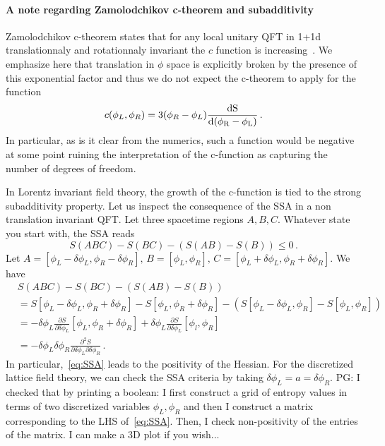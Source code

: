 \documentclass[a4paper]{article}
\newcommand{\purple}[1]{{\color{purple} #1 \color{black}}}
\newcommand{\PG}[1]{{\purple{PG: #1}}} %
\begin{document}
\paragraph{A note regarding Zamolodchikov c-theorem and subadditivity}
Zamolodchikov c-theorem states that for any local unitary QFT in 1+1d translationnaly and rotationnaly invariant the $c$ function is increasing~\cite{Zamolodchikov:1986gt}\cite{Casini_2007}. We emphasize here that translation in $\phi$ space is explicitly broken by the presence of this exponential factor and thus we do not expect the c-theorem to apply for the function
\begin{equation}
  c(\phi_L,\phi_R) = 3(\phi_R-\phi_L)\frac{\rm{d} S}{\rm{d}(\phi_R -\phi_L)}\,.
\end{equation}
In particular, as is it clear from the numerics, such a function would be negative at some point ruining the interpretation of the c-function as capturing the number of degrees of freedom.

In Lorentz invariant field theory, the growth of the c-function is tied to the strong subadditivity property. Let us inspect the consequence of the SSA in a non translation invariant QFT. Let three spacetime regions $A,B,C$. Whatever state you start with, the SSA reads
\begin{equation}\label{eq:SSA}
  S(ABC)-S(BC)-\left(S(AB)-S(B)\right) \leq 0\,.
\end{equation}
Let $A=[\phi_L-\delta \phi_L, \phi_R - \delta \phi_R],\,B =[\phi_L, \phi_R],\, C=[\phi_L+\delta \phi_L, \phi_R + \delta \phi_R]$.
We have
\begin{equation}
\begin{aligned}
  &S(ABC)-S(BC)-\left(S(AB)-S(B)\right) \\
  &= S[\phi_L-\delta \phi_L, \phi_R + \delta \phi_R] - S[\phi_L, \phi_R + \delta \phi_R] -\left(S[\phi_L- \delta \phi_L, \phi_R]- S[\phi_L, \phi_R]\right)\\
  &=-\delta \phi_L \frac{\partial S}{\partial \delta \phi_L}[\phi_L,\phi_R + \delta \phi_R] + \delta \phi_L \frac{\partial S}{\partial \delta \phi_L}[\phi_l, \phi_R]\\
  &= -\delta \phi_L \delta \phi_R \frac{\partial ^2 S}{\partial \delta \phi_L \partial \delta \phi_R}\,.
\end{aligned}
\end{equation} 
In particular,~\eqref{eq:SSA} leads to the positivity of the Hessian. For the discretized lattice field theory, we can check the SSA criteria by taking $\delta \phi_L = a = \delta \phi_R$. \PG{I checked that by printing a boolean: I first construct a grid of entropy values in terms of two discretized variables $\phi_L, \phi_R$ and then I construct a matrix corresponding to the LHS of~\eqref{eq:SSA}. Then, I check non-positivity of the entries of the matrix. I can make a 3D plot if you wish...}
\end{document}
